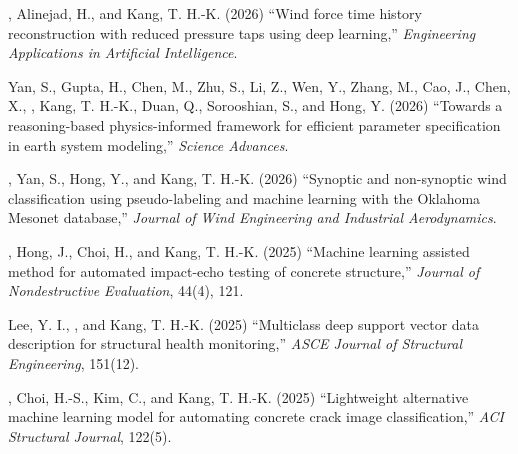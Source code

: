 \begin{pubSubsectionNum}
    \item \me, Alinejad, H., and Kang, T. H.-K. (2026) ``Wind force time history reconstruction with reduced pressure taps using deep learning,'' \textit{Engineering Applications in Artificial Intelligence}. \underreview
    \item Yan, S., Gupta, H., Chen, M., Zhu, S., Li, Z., Wen, Y., Zhang, M., Cao, J., Chen, X., \me, Kang, T. H.-K., Duan, Q., Sorooshian, S., and Hong, Y. (2026) ``Towards a reasoning-based physics-informed framework for efficient parameter specification in earth system modeling,'' \textit{Science Advances}. \underreview
    \item \me, Yan, S., Hong, Y., and Kang, T. H.-K. (2026) ``Synoptic and non-synoptic wind classification using pseudo-labeling and machine learning with the Oklahoma Mesonet database,'' \textit{Journal of Wind Engineering and Industrial Aerodynamics}. \underreview
    \item \me, Hong, J., Choi, H., and Kang, T. H.-K. (2025) ``Machine learning assisted method for automated impact-echo testing of concrete structure,'' \textit{Journal of Nondestructive Evaluation}, 44(4), 121.
    \item Lee, Y. I., \me, and Kang, T. H.-K. (2025) ``Multiclass deep support vector data description for structural health monitoring,'' \textit{ASCE Journal of Structural Engineering}, 151(12).
    \item \me, Choi, H.-S., Kim, C., and Kang, T. H.-K. (2025) ``Lightweight alternative machine learning model for automating concrete crack image classification,'' \textit{ACI Structural Journal}, 122(5).
\end{pubSubsectionNum}
